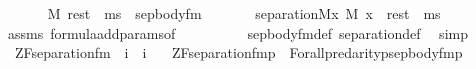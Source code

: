 \begin{isabellebody}
\ \ \isanewline
\ \ \ \ {\isachardoublequoteopen}M{\isacharcomma}{\kern0pt}\ rest\ {\isacharat}{\kern0pt}\ ms\ {\isasymTurnstile}\ sep{\isacharunderscore}{\kern0pt}body{\isacharunderscore}{\kern0pt}fm{\isacharparenleft}{\kern0pt}{\isasymphi}{\isacharparenright}{\kern0pt}\ {\isasymlongleftrightarrow}\ \isanewline
\ \ \ \ \ separation{\isacharparenleft}{\kern0pt}{\isacharhash}{\kern0pt}{\isacharhash}{\kern0pt}M{\isacharcomma}{\kern0pt}{\isasymlambda}x{\isachardot}{\kern0pt}\ M{\isacharcomma}{\kern0pt}\ {\isacharbrackleft}{\kern0pt}x{\isacharbrackright}{\kern0pt}\ {\isacharat}{\kern0pt}\ rest\ {\isacharat}{\kern0pt}\ ms\ {\isasymTurnstile}\ {\isasymphi}{\isacharparenright}{\kern0pt}{\isachardoublequoteclose}\isanewline
%
\isadelimproof
\ \ %
\endisadelimproof
%
\isatagproof
{}\isamarkupfalse%
\ assms\ formula{\isacharunderscore}{\kern0pt}add{\isacharunderscore}{\kern0pt}params{}{\isacharbrackleft}{\kern0pt}of\ {\isacharunderscore}{\kern0pt}\ {}\ {\isacharunderscore}{\kern0pt}\ {\isacharunderscore}{\kern0pt}\ {\isachardoublequoteopen}{\isacharbrackleft}{\kern0pt}{\isacharunderscore}{\kern0pt}{\isacharcomma}{\kern0pt}{\isacharunderscore}{\kern0pt}{\isacharbrackright}{\kern0pt}{\isachardoublequoteclose}\ {\isacharbrackright}{\kern0pt}\isanewline
\ \ \isamarkupfalse%
\ sep{\isacharunderscore}{\kern0pt}body{\isacharunderscore}{\kern0pt}fm{\isacharunderscore}{\kern0pt}def\ separation{\isacharunderscore}{\kern0pt}def\ \isamarkupfalse%
\ simp%
\endisatagproof
{\isafoldproof}%
%
\isadelimproof
\isanewline
%
\endisadelimproof
\isanewline
{}\isamarkupfalse%
\isanewline
\ \ ZF{\isacharunderscore}{\kern0pt}separation{\isacharunderscore}{\kern0pt}fm\ {\isacharcolon}{\kern0pt}{\isacharcolon}{\kern0pt}\ {\isachardoublequoteopen}i\ {\isasymRightarrow}\ i{\isachardoublequoteclose}\ \isanewline
\ \ {\isachardoublequoteopen}ZF{\isacharunderscore}{\kern0pt}separation{\isacharunderscore}{\kern0pt}fm{\isacharparenleft}{\kern0pt}p{\isacharparenright}{\kern0pt}\ {\isasymequiv}\ Forall{\isacharcircum}{\kern0pt}{\isacharparenleft}{\kern0pt}pred{\isacharparenleft}{\kern0pt}arity{\isacharparenleft}{\kern0pt}p{\isacharparenright}{\kern0pt}{\isacharparenright}{\kern0pt}{\isacharparenright}{\kern0pt}{\isacharparenleft}{\kern0pt}sep{\isacharunderscore}{\kern0pt}body{\isacharunderscore}{\kern0pt}fm{\isacharparenleft}{\kern0pt}p{\isacharparenright}{\kern0pt}{\isacharparenright}{\kern0pt}{\isachardoublequoteclose}\isanewline
\isanewline
{}\isamarkupfalse%

\end{isabellebody}
